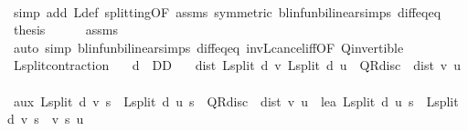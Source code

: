 \begin{isabellebody}
\ \ \ \ \isamarkupfalse%
\ {\isacharparenleft}{\kern0pt}simp\ add{\isacharcolon}{\kern0pt}\ L{\isacharunderscore}{\kern0pt}def\ splitting{\isacharbrackleft}{\kern0pt}OF\ assms{\isacharcomma}{\kern0pt}\ symmetric{\isacharbrackright}{\kern0pt}\ blinfun{\isachardot}{\kern0pt}bilinear{\isacharunderscore}{\kern0pt}simps\ diff{\isacharunderscore}{\kern0pt}eq{\isacharunderscore}{\kern0pt}eq{\isacharparenright}{\kern0pt}\isanewline
\ \ \isamarkupfalse%
\ {\isacharquery}{\kern0pt}thesis\isanewline
\ \ \ \ \isamarkupfalse%
\ assms\isanewline
\ \ \ \ \isamarkupfalse%
\ {\isacharparenleft}{\kern0pt}auto\ simp{\isacharcolon}{\kern0pt}\ blinfun{\isachardot}{\kern0pt}bilinear{\isacharunderscore}{\kern0pt}simps\ diff{\isacharunderscore}{\kern0pt}eq{\isacharunderscore}{\kern0pt}eq\ inv\isactrlsub L{\isacharunderscore}{\kern0pt}cancel{\isacharunderscore}{\kern0pt}iff{\isacharbrackleft}{\kern0pt}OF\ Q{\isacharunderscore}{\kern0pt}invertible{\isacharbrackright}{\kern0pt}{\isacharparenright}{\kern0pt}\isanewline
{}\isamarkupfalse%
%
\endisatagproof
{\isafoldproof}%
%
\isadelimproof
\isanewline
%
\endisadelimproof
\isanewline
{}\isamarkupfalse%
\ L{\isacharunderscore}{\kern0pt}split{\isacharunderscore}{\kern0pt}contraction{\isacharcolon}{\kern0pt}\isanewline
\ \ \ {\isachardoublequoteopen}d\ {\isasymin}\ D\isactrlsub D{\isachardoublequoteclose}\isanewline
\ \ \ {\isachardoublequoteopen}dist\ {\isacharparenleft}{\kern0pt}L{\isacharunderscore}{\kern0pt}split\ d\ v{\isacharparenright}{\kern0pt}\ {\isacharparenleft}{\kern0pt}L{\isacharunderscore}{\kern0pt}split\ d\ u{\isacharparenright}{\kern0pt}\ {\isasymle}\ QR{\isacharunderscore}{\kern0pt}disc\ {\isacharasterisk}{\kern0pt}\ dist\ v\ u{\isachardoublequoteclose}\isanewline
%
\isadelimproof
%
\endisadelimproof
%
\isatagproof
{}\isamarkupfalse%
\ {\isacharminus}{\kern0pt}\isanewline
\ \ \isamarkupfalse%
\ aux{\isacharcolon}{\kern0pt}\ {\isachardoublequoteopen}L{\isacharunderscore}{\kern0pt}split\ d\ v\ s\ {\isacharminus}{\kern0pt}\ L{\isacharunderscore}{\kern0pt}split\ d\ u\ s\ {\isasymle}\ QR{\isacharunderscore}{\kern0pt}disc\ {\isacharasterisk}{\kern0pt}\ dist\ v\ u{\isachardoublequoteclose}\ \ lea{\isacharcolon}{\kern0pt}\ {\isachardoublequoteopen}{\isacharparenleft}{\kern0pt}L{\isacharunderscore}{\kern0pt}split\ d\ u\ s{\isacharparenright}{\kern0pt}\ {\isasymle}\ {\isacharparenleft}{\kern0pt}L{\isacharunderscore}{\kern0pt}split\ d\ v\ s{\isacharparenright}{\kern0pt}{\isachardoublequoteclose}\ \ v\ s\ u\isanewline

\end{isabellebody}
